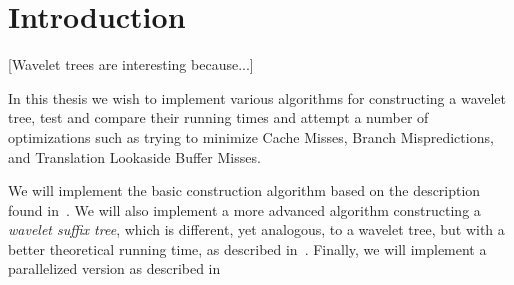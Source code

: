 \section{Introduction}
[Wavelet trees are interesting because...]

In this thesis we wish to implement various algorithms for constructing a wavelet tree, test and compare their running times and attempt a number of optimizations such as trying to minimize Cache Misses, Branch Mispredictions, and Translation Lookaside Buffer Misses.

We will implement the basic construction algorithm based on the description found in~\citep{ Navjda13}. 
We will also implement a more advanced algorithm constructing a \textit{wavelet suffix tree}, which is different, yet analogous, to a wavelet tree, but with a better theoretical running time, as described in~\citep{DBLP:journals/corr/BabenkoGKS14}. Finally, we will implement a parallelized version as described in~\citep{DBLP:journals/corr/Shun14}
